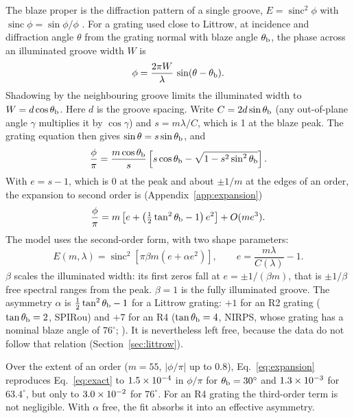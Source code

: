 \documentclass[11pt,a4paper]{article}
\newcommand{\sinc}{\operatorname{sinc}}
\begin{document}
The blaze proper is the diffraction pattern of a single groove, $E = \sinc^2\phi$ with $\sinc\phi=\sin\phi/\phi$ \citep{Schroeder2000}. For a grating used close to Littrow, at incidence and diffraction angle $\theta$ from the grating normal with blaze angle $\theta_{\rm b}$, the phase across an illuminated groove width $W$ is
\begin{equation}
\phi = \frac{2\pi W}{\lambda}\,\sin(\theta-\theta_{\rm b}).
\end{equation}
Shadowing by the neighbouring groove limits the illuminated width to $W = d\cos\theta_{\rm b}$. Here $d$ is the groove spacing. Write $C = 2d\sin\theta_{\rm b}$ (any out-of-plane angle $\gamma$ multiplies it by $\cos\gamma$) and $s = m\lambda/C$, which is 1 at the blaze peak. The grating equation then gives $\sin\theta = s\sin\theta_{\rm b}$, and
\begin{equation}
\frac{\phi}{\pi} = \frac{m\cos\theta_{\rm b}}{s}\left[s\cos\theta_{\rm b}-\sqrt{1-s^2\sin^2\theta_{\rm b}}\right].
\label{eq:exact}
\end{equation}
With $e = s-1$, which is 0 at the peak and about $\pm1/m$ at the edges of an order, the expansion to second order is (Appendix~\ref{app:expansion})
\begin{equation}
\frac{\phi}{\pi} = m\left[e + \left(\tfrac12\tan^2\theta_{\rm b}-1\right)e^2\right] + O(m e^3).
\label{eq:expansion}
\end{equation}
The model uses the second-order form, with two shape parameters:
\begin{equation}
E(m,\lambda) = \sinc^2\!\left[\pi\beta m\left(e+\alpha e^2\right)\right],\qquad e = \frac{m\lambda}{C(\lambda)}-1.
\label{eq:envelope}
\end{equation}
$\beta$ scales the illuminated width: its first zeros fall at $e = \pm1/(\beta m)$, that is $\pm1/\beta$ free spectral ranges from the peak. $\beta=1$ is the fully illuminated groove. The asymmetry $\alpha$ is $\tfrac12\tan^2\theta_{\rm b}-1$ for a Littrow grating: $+1$ for an R2 grating ($\tan\theta_{\rm b}=2$, SPIRou) and $+7$ for an R4 ($\tan\theta_{\rm b}=4$, NIRPS, whose grating has a nominal blaze angle of $76^\circ$; \citealt{LFW2017}). It is nevertheless left free, because the data do not follow that relation (Section~\ref{sec:littrow}).

Over the extent of an order ($m=55$, $|\phi/\pi|$ up to 0.8), Eq.~\ref{eq:expansion} reproduces Eq.~\ref{eq:exact} to $1.5\times10^{-4}$ in $\phi/\pi$ for $\theta_{\rm b}=30^\circ$ and $1.3\times10^{-3}$ for $63.4^\circ$, but only to $3.0\times10^{-2}$ for $76^\circ$. For an R4 grating the third-order term is not negligible. With $\alpha$ free, the fit absorbs it into an effective asymmetry.
\end{document}
